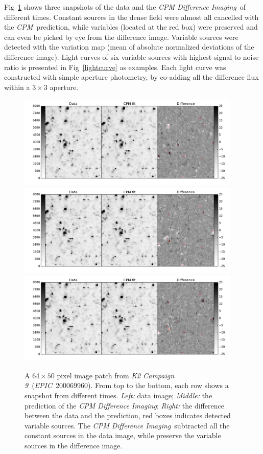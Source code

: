 \documentclass[12pt, preprint]{aastex}
\newcommand{\project}[1]{\textsl{#1}}
\newcommand{\cpm}{\project{CPM}}
\newcommand{\cpmdiff}{\project{CPM Difference Imaging}}
\newcommand{\KTCN}{\project{K2 Campaign 9}}
\newcommand{\epic}{\project{EPIC}}
\begin{document}
Fig~\ref{k2c9} shows three snapshots of the data and the \cpmdiff\ of different times.
Constant sources in the dense field were almost all cancelled with the \cpm\ prediction, while variables (located at the red box) were preserved and can even be picked by eye from the difference image.
Variable sources were detected with the variation map (mean of absolute normalized deviations of the difference image). 
Light curves of six variable sources with highest signal to noise ratio is presented in Fig~\ref{lightcurve} as examples. 
Each light curve was constructed with simple aperture photometry, by co-adding all the difference flux within a $3 \times 3$ aperture.

\begin{figure}[p]
\begin{center}
\includegraphics[width=0.95\textwidth]{f3a}
\includegraphics[width=0.95\textwidth]{f3b}
\includegraphics[width=0.95\textwidth]{f3c}
\end{center}
\caption{
  \label{k2c9}
  A $64\times 50$ pixel image patch from \KTCN\ (\epic\ 200069960). From top to the bottom,  each row shows a snapshot from different times.
  \emph{Left:} data image;
  \emph{Middle:} the prediction of the \cpmdiff;
  \emph{Right:} the difference between the data and the prediction, red boxes indicates detected variable sources.  
  The \cpmdiff\ subtracted all the constant sources in the data image, while preserve the variable sources in the difference image.
}
\end{figure}
\end{document}
